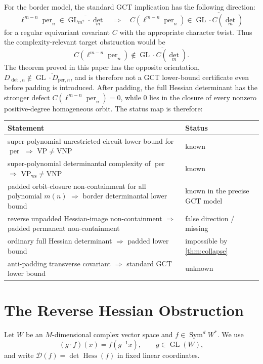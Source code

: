 \documentclass[11pt]{article}
\theoremstyle{definition}
\theoremstyle{remark}
\DeclareMathOperator{\Hess}{Hess}
\DeclareMathOperator{\per}{per}
\newcommand{\Sym}{\operatorname{Sym}}
\newcommand{\GL}{\operatorname{GL}}
\begin{document}
For the border model, the standard GCT implication has the following direction:
\[
 \ell^{m-n}\per_n\in\overline{\GL_{m^2}\cdot\det_m}
 \quad\Longrightarrow\quad
 C(\ell^{m-n}\per_n)
 \in\overline{\GL\cdot C(\det_m)}                         \tag{2.1}
\]
for a regular equivariant covariant $C$ with the appropriate character twist.
Thus the complexity-relevant target obstruction would be
\[
 C(\ell^{m-n}\per_n)\notin\overline{\GL\cdot C(\det_m)}. \tag{2.2}
\]
The theorem proved in this paper has the opposite orientation,
$D_{\det,n}\notin\overline{\GL\cdot D_{\mathrm{per},n}}$, and is therefore
not a GCT lower-bound certificate even before padding is introduced.  After
padding, the full Hessian determinant has the stronger defect
$C(\ell^{m-n}\per_n)=0$, while $0$ lies in the closure of every nonzero
positive-degree homogeneous orbit.  The status map is therefore:
\begin{center}
\begin{tabular}{p{}p{}}
\toprule
Statement & Status\\\midrule
super-polynomial unrestricted circuit lower bound for $\per$ $\Rightarrow$ $\mathrm{VP}\ne\mathrm{VNP}$ & known\\
super-polynomial determinantal complexity of $\per$ $\Rightarrow$ $\mathrm{VP}_{\mathrm{ws}}\ne\mathrm{VNP}$ & known\\
padded orbit-closure non-containment for all polynomial $m(n)$ $\Rightarrow$ border determinantal lower bound & known in the precise GCT model\\
reverse unpadded Hessian-image non-containment $\Rightarrow$ padded permanent non-containment & false direction / missing\\
ordinary full Hessian determinant $\Rightarrow$ padded lower bound & impossible by \cref{thm:collapse}\\
anti-padding transverse covariant $\Rightarrow$ standard GCT lower bound & unknown\\
\bottomrule
\end{tabular}
\end{center}

\section{The Reverse Hessian Obstruction}

Let $W$ be an $M$-dimensional complex vector space and
$f\in\Sym^dW^*$.  We use
\[
(g\cdot f)(x)=f(g^{-1}x),\qquad g\in\GL(W),
\]
and write $\mathcal D(f)=\det\Hess(f)$ in fixed linear coordinates.
\end{document}
